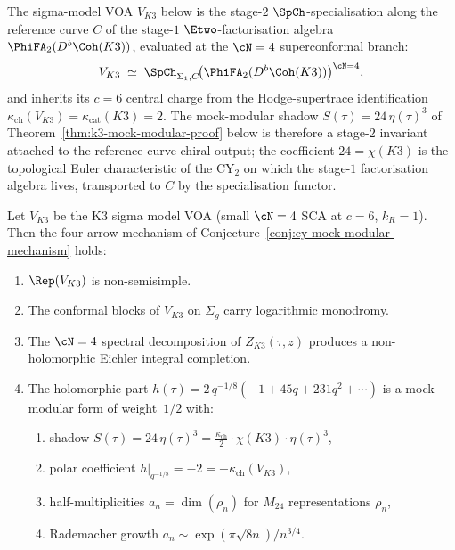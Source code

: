 \begin{remark}
\label{rem:k3y-stage-mock-modular}
The sigma-model VOA $V_{K3}$ below is the stage-$2$
$\SpCh$-specialisation along the reference curve $C$ of the
stage-$1$ $\Etwo$-factorisation algebra $\PhiFA_2(D^b\Coh(K3))$,
evaluated at the $\cN = 4$ superconformal branch:
\[
 V_{K3}
 \;\simeq\;
 \SpCh_{\Sigma_1, C}\!\bigl(\PhiFA_2(D^b\Coh(K3))\bigr)^{\cN = 4},
\]
and inherits its $c = 6$ central charge from the Hodge-supertrace
identification $\kappa_{\mathrm{ch}}(V_{K3}) =
\kappa_{\mathrm{cat}}(K3) = 2$. The mock-modular shadow
$S(\tau) = 24\,\eta(\tau)^3$ of Theorem~\ref{thm:k3-mock-modular-proof}
below is therefore a stage-$2$ invariant attached to the reference-curve
chiral output; the coefficient $24 = \chi(K3)$ is the topological Euler
characteristic of the CY$_2$ on which the stage-$1$ factorisation
algebra lives, transported to $C$ by the specialisation functor.
\end{remark}

\begin{theorem}[K3 mock modularity at \texorpdfstring{$d = 2$}{d = 2}]
\label{thm:k3-mock-modular-proof}
Let $V_{K3}$ be the K3 sigma model VOA \textup{(}small $\cN = 4$ SCA at $c = 6$, $k_R = 1$\textup{)}. Then the four-arrow mechanism of Conjecture~\textup{\ref{conj:cy-mock-modular-mechanism}} holds:
\begin{enumerate}[label=\textup{(\arabic*)}]
\item $\Rep(V_{K3})$ is non-semisimple.
\item The conformal blocks of $V_{K3}$ on $\Sigma_g$ carry logarithmic monodromy.
\item The $\cN = 4$ spectral decomposition of $Z_{K3}(\tau, z)$ produces a non-holomorphic Eichler integral completion.
\item The holomorphic part $h(\tau) = 2\,q^{-1/8}(-1 + 45q + 231q^2 + \cdots)$ is a mock modular form of weight~$1/2$ with:
\begin{enumerate}[label=\textup{(\alph*)}]
\item shadow $S(\tau) = 24\,\eta(\tau)^3 = \frac{\kappa_{\mathrm{ch}}}{2} \cdot \chi(K3) \cdot \eta(\tau)^3$,
\item polar coefficient $h|_{q^{-1/8}} = -2 = -\kappa_{\mathrm{ch}}(V_{K3})$,
\item half-multiplicities $a_n = \dim(\rho_n)$ for $M_{24}$ representations $\rho_n$,
\item Rademacher growth $a_n \sim \exp(\pi\sqrt{8n}) / n^{3/4}$.
\end{enumerate}
\end{enumerate}
\end{theorem}

